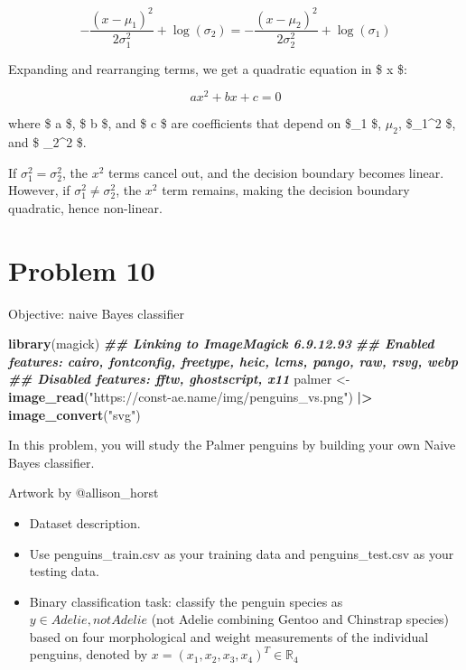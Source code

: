 \documentclass[
]{article}
\newenvironment{Shaded}{\begin{snugshade}}{\end{snugshade}}
\newcommand{\DocumentationTok}[1]{\textcolor[rgb]{0.56,0.35,0.01}{\textbf{\textit{#1}}}}
\newcommand{\FunctionTok}[1]{\textcolor[rgb]{0.13,0.29,0.53}{\textbf{#1}}}
\newcommand{\NormalTok}[1]{#1}
\newcommand{\OtherTok}[1]{\textcolor[rgb]{0.56,0.35,0.01}{#1}}
\newcommand{\SpecialCharTok}[1]{\textcolor[rgb]{0.81,0.36,0.00}{\textbf{#1}}}
\newcommand{\StringTok}[1]{\textcolor[rgb]{0.31,0.60,0.02}{#1}}
\begin{document}
\[ 
-\frac{(x - \mu_1)^2}{2\sigma_1^2} + \log(\sigma_2) = -\frac{(x - \mu_2)^2}{2\sigma_2^2} + \log(\sigma_1) 
\]

Expanding and rearranging terms, we get a quadratic equation in \$ x \$:

\[ 
a x^2 + b x + c = 0 
\]

where \$ a \$, \$ b \$, and \$ c \$ are coefficients that depend on
\$\mu\_1 \$, \(\mu_2\), \$\sigma\_1\^{}2 \$, and \$ \sigma\_2\^{}2 \$.

If \(\sigma_1^2 = \sigma_2^2\), the \(x^2\) terms cancel out, and the
decision boundary becomes linear. However, if
\(\sigma_1^2 \neq \sigma_2^2\), the \(x^2\) term remains, making the
decision boundary quadratic, hence non-linear.

\hypertarget{problem-10}{%
\section{Problem 10}\label{problem-10}}

Objective: naive Bayes classifier

\begin{Shaded}
\begin{Highlighting}[]
\FunctionTok{library}\NormalTok{(magick)}
\DocumentationTok{\#\# Linking to ImageMagick 6.9.12.93}
\DocumentationTok{\#\# Enabled features: cairo, fontconfig, freetype, heic, lcms, pango, raw, rsvg, webp}
\DocumentationTok{\#\# Disabled features: fftw, ghostscript, x11}
\NormalTok{palmer }\OtherTok{\textless{}{-}} \FunctionTok{image\_read}\NormalTok{(}\StringTok{"https://const{-}ae.name/img/penguins\_vs.png"}\NormalTok{) }\SpecialCharTok{|\textgreater{}}
  \FunctionTok{image\_convert}\NormalTok{(}\StringTok{"svg"}\NormalTok{)}
\end{Highlighting}
\end{Shaded}

In this problem, you will study the Palmer penguins by building your own
Naive Bayes classifier.

Artwork by @allison\_horst

\begin{itemize}
\item
  Dataset description.
\item
  Use penguins\_train.csv as your training data and penguins\_test.csv
  as your testing data.
\item
  Binary classification task: classify the penguin species as
  \(y \in {Adelie, notAdelie}\) (not Adelie combining Gentoo and
  Chinstrap species) based on four morphological and weight measurements
  of the individual penguins, denoted by
  \(x=(x_1, x_2, x_3, x_4)^T \in \mathbb{R}_4\)
\end{itemize}
\end{document}
